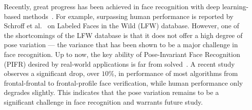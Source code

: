 \documentclass[10pt,journal,compsoc]{IEEEtran}
\begin{document}
\IEEEdisplaynontitleabstractindextext



%
\IEEEpeerreviewmaketitle


Recently, great progress has been achieved in face recognition with deep learning-based methods~\cite{taigman2014deepface, parkhi2015deep, schroff2015facenet}.
For example, surpassing human performance is reported by Schroff et al.~\cite{schroff2015facenet} on Labeled
Faces in the Wild (LFW) database. 
However, one of the shortcomings of the LFW database is that it does not offer a high degree of pose variation --- the variance that has been shown to be a major challenge in face recognition. 
Up to now, the key ability of Pose-Invariant Face Recognition (PIFR) desired by real-world applications is far from solved~\cite{liu2005pose, liu2006optimal, chai2007locally, abiantun2014sparse, ding2016comprehensive}.
A recent study~\cite{sengupta2016frontal} observes a significant drop, over $10\%$, in performance of most algorithms from frontal-frontal to frontal-profile face verification, while human performance only degrades slightly.
%
This indicates that the pose variation remains to be a significant challenge in face recognition and warrants future study.
\end{document}

